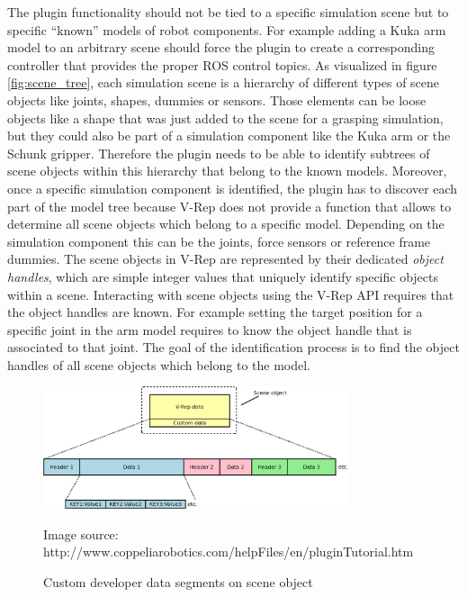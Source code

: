 The plugin functionality should not be tied to a specific simulation scene but to specific ``known'' models of robot components. For example adding a Kuka arm model to an arbitrary scene should force the plugin to create a corresponding controller that provides the proper ROS control topics. As visualized in figure \ref{fig:scene_tree}, each simulation scene is a hierarchy of different types of scene objects like joints, shapes, dummies or sensors. Those elements can be loose objects like a shape that was just added to the scene for a grasping simulation, but they could also be part of a simulation component like the Kuka arm or the Schunk gripper. Therefore the plugin needs to be able to identify subtrees of scene objects within this hierarchy that belong to the known models. Moreover, once a specific simulation component is identified, the plugin has to discover each part of the model tree because V-Rep does not provide a function that allows to determine all scene objects which belong to a specific model. Depending on the simulation component this can be the joints, force sensors or reference frame dummies. The scene objects in V-Rep are represented by their dedicated \emph{object handles}, which are simple integer values that uniquely identify specific objects within a scene. Interacting with scene objects using the V-Rep API requires that the object handles are known. For example setting the target position for a specific joint in the arm model requires to know the object handle that is associated to that joint. The goal of the identification process is to find the object handles of all scene objects which belong to the model. \\

\begin{figure}[h]
	\centering
  	\includegraphics[width=0.8\textwidth]{images/custom_dev_data.jpg}
	\caption{Custom developer data segments on scene object}
	{\scriptsize Image source: http://www.coppeliarobotics.com/helpFiles/en/pluginTutorial.htm}
	\label{fig:cust_dev_data}
\end{figure}

